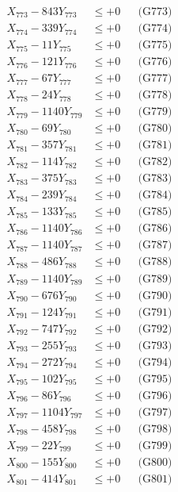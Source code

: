 \documentclass[a4paper,10pt]{article}
\begin{document}
{\begin{align}
X_{773} - 843Y_{773} &\leq +0 && \text{(G773)} \\
X_{774} - 339Y_{774} &\leq +0 && \text{(G774)} \\
X_{775} - 11Y_{775} &\leq +0 && \text{(G775)} \\
X_{776} - 121Y_{776} &\leq +0 && \text{(G776)} \\
X_{777} - 67Y_{777} &\leq +0 && \text{(G777)} \\
X_{778} - 24Y_{778} &\leq +0 && \text{(G778)} \\
X_{779} - 1140Y_{779} &\leq +0 && \text{(G779)} \\
X_{780} - 69Y_{780} &\leq +0 && \text{(G780)} \\
\allowbreak
X_{781} - 357Y_{781} &\leq +0 && \text{(G781)} \\
X_{782} - 114Y_{782} &\leq +0 && \text{(G782)} \\
X_{783} - 375Y_{783} &\leq +0 && \text{(G783)} \\
X_{784} - 239Y_{784} &\leq +0 && \text{(G784)} \\
X_{785} - 133Y_{785} &\leq +0 && \text{(G785)} \\
X_{786} - 1140Y_{786} &\leq +0 && \text{(G786)} \\
X_{787} - 1140Y_{787} &\leq +0 && \text{(G787)} \\
X_{788} - 486Y_{788} &\leq +0 && \text{(G788)} \\
X_{789} - 1140Y_{789} &\leq +0 && \text{(G789)} \\
X_{790} - 676Y_{790} &\leq +0 && \text{(G790)} \\
\allowbreak
X_{791} - 124Y_{791} &\leq +0 && \text{(G791)} \\
X_{792} - 747Y_{792} &\leq +0 && \text{(G792)} \\
X_{793} - 255Y_{793} &\leq +0 && \text{(G793)} \\
X_{794} - 272Y_{794} &\leq +0 && \text{(G794)} \\
X_{795} - 102Y_{795} &\leq +0 && \text{(G795)} \\
X_{796} - 86Y_{796} &\leq +0 && \text{(G796)} \\
X_{797} - 1104Y_{797} &\leq +0 && \text{(G797)} \\
X_{798} - 458Y_{798} &\leq +0 && \text{(G798)} \\
X_{799} - 22Y_{799} &\leq +0 && \text{(G799)} \\
X_{800} - 155Y_{800} &\leq +0 && \text{(G800)} \\
\allowbreak
X_{801} - 414Y_{801} &\leq +0 && \text{(G801)} \\

\end{align}}
\end{document}
